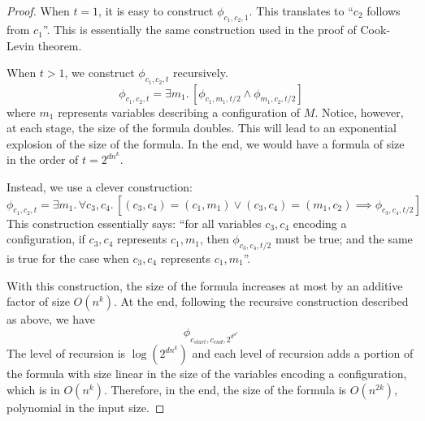 \begin{proof}
    When $t=1$, it is easy to construct $\phi_{c_1,c_2,1}$. This translates to ``$c_2$ follows from $c_1$''. This is essentially the same construction used in the proof of Cook-Levin theorem.

    When $t > 1$, we construct $\phi_{c_1,c_2,t}$ recursively.
    $$
    \phi_{c_1,c_2,t} = \exists m_1.\, [\phi_{c_1,m_1,t/2} \land \phi_{m_1,c_2,t/2}]
    $$
    where $m_1$ represents variables describing a configuration of $M$. Notice, however, at each stage, the size of the formula doubles. This will lead to an exponential explosion of the size of the formula. In the end, we would have a formula of size in the order of $t = 2^{dn^k}$.

    Instead, we use a clever construction:
    $$
    \phi_{c_1,c_2,t} = \exists m_1.\, \forall c_3,c_4.\, [ (c_3,c_4) = (c_1,m_1) \lor (c_3,c_4) = (m_1,c_2) \implies \phi_{c_3,c_4,t/2} ]
    $$
    This construction essentially says: ``for all variables $c_3,c_4$ encoding a configuration, if $c_3,c_4$ represents $c_1,m_1$, then $\phi_{c_3,c_4,t/2}$ must be true; and the same is true for the case when $c_3,c_4$ represents $c_1,m_1$''.

    With this construction, the size of the formula increases at most by an additive factor of size $O(n^k)$. At the end, following the recursive construction described as above, we have 
    $$
    \phi_{c_{start},c_{end},2^{d^{n^k}}}
    $$
    The level of recursion is $\log(2^{dn^k})$ and each level of recursion adds a portion of the formula with size linear in the size of the variables encoding a configuration, which is in $O(n^k)$. Therefore, in the end, the size of the formula is $O(n^{2k})$, polynomial in the input size.
\end{proof}